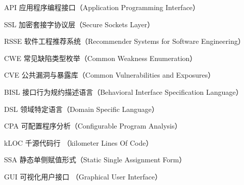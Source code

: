 \begin{denotation}[3cm]
\item[API] 应用程序编程接口（Application Programming Interface）
\item[SSL] 加密套接字协议层（Secure Sockets Layer）
\item[RSSE] 软件工程推荐系统（Recommender Systems for Software Engineering）
\item[CWE] 常见缺陷类型枚举（Common Weakness Enumeration）
\item[CVE] 公共漏洞与暴露库（Common Vulnerabilities and Exposures）
\item[BISL] 接口行为规约描述语言（Behavioral Interface Specification Language）
\item[DSL] 领域特定语言（Domain Specific Language）
\item[CPA] 可配置程序分析（Configurable Program Analysis）
\item[kLOC] 千源代码行 （kilometer Lines Of Code）
\item[SSA] 静态单侧赋值形式（Static Single Assignment Form）
\item[GUI] 可视化用户接口 （Graphical User Interface）
\end{denotation}
